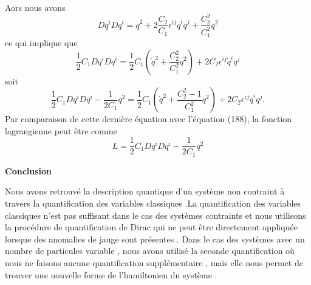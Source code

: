 \documentclass[12pt,a4paper, openany]{article}
\begin{document}
		 Aors nous avons 
		 \begin{equation}
		 Dq^iDq^i=\dot{q}^2+2\frac{C_2}{C_1}\epsilon^{ij}\dot{q}^iq^j+\frac{C^2_2}{C^2_1}q^2	
		 \end{equation}
		 ce qui implique que 
		 $$\frac{1}{2}C_1Dq^iDq^i=\frac{1}{2}C_1\left(\dot{q}^2+\frac{C^2_2}{C^2_1}q^2\right)+2C_2 \epsilon^{ij} \dot{q}^iq^j $$ 
		 soit 
		 \begin{equation}
		 \frac{1}{2}C_1Dq^iDq^i-\frac{1}{2C_1}q^2=\frac{1}{2}C_1\left(\dot{q}^2+\frac{C^2_2-1}{C^2_1}q^2\right)+2C_2 \epsilon^{ij}\dot{q}^iq^j . 	
		 \end{equation}
		 Par comparaison de cette dernière équation avec l'équation (188), la fonction lagrangienne peut \^{e}tre comme 
		 \begin{equation}
		 	L= \frac{1}{2}C_1Dq^iDq^i-\frac{1}{2C_1}q^2
		 \end{equation}
		 
		 
		 
		 
		 \newpage
		 \begin{center}
		 	\textbf{Conclusion}
		 \end{center}

Nous avons retrouvé la description quantique d'un système non contraint à travers la quantification des variables classiques .La quantification des variables classiques n'est pas suffisant dans le cas des systèmes contraints et nous utilisons la procédure de quantification de Dirac qui  ne peut \^{e}tre directement appliquée lorsque des anomalies de jauge sont présentes . Dans le cas des systèmes avec un nombre de particules variable , nous avons utilisé  la seconde quantification où nous ne faisons aucune quantification supplémentaire , mais elle nous permet de trouver une nouvelle forme de l'hamiltonien du système .\\
\end{document}
